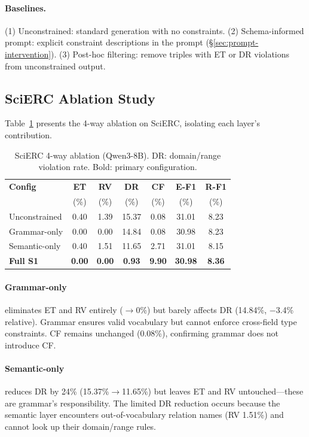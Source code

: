 \documentclass[11pt,a4paper]{article}
\begin{document}
\paragraph{Baselines.} (1) Unconstrained: standard generation with no constraints. (2) Schema-informed prompt: explicit constraint descriptions in the prompt (\S\ref{sec:prompt-intervention}). (3) Post-hoc filtering: remove triples with ET or DR violations from unconstrained output.

\subsection{SciERC Ablation Study}
\label{sec:scierc-ablation}

Table~\ref{tab:scierc-ablation} presents the 4-way ablation on SciERC, isolating each layer's contribution.

\begin{table}[t]
\centering
\small
\caption{SciERC 4-way ablation (Qwen3-8B). DR: domain/range violation rate. Bold: primary configuration.}
\label{tab:scierc-ablation}
\begin{tabular}{lcccccc}
\toprule
\textbf{Config} & \textbf{ET} & \textbf{RV} & \textbf{DR} & \textbf{CF} & \textbf{E-F1} & \textbf{R-F1} \\
 & (\%) & (\%) & (\%) & (\%) & (\%) & (\%) \\
\midrule
Unconstrained & 0.40 & 1.39 & 15.37 & 0.08 & 31.01 & 8.23 \\
Grammar-only & 0.00 & 0.00 & 14.84 & 0.08 & 30.98 & 8.23 \\
Semantic-only & 0.40 & 1.51 & 11.65 & 2.71 & 31.01 & 8.15 \\
\textbf{Full S1} & \textbf{0.00} & \textbf{0.00} & \textbf{0.93} & \textbf{9.90} & \textbf{30.98} & \textbf{8.36} \\
\bottomrule
\end{tabular}
\end{table}

\paragraph{Grammar-only} eliminates ET and RV entirely ($\to$0\%) but barely affects DR (14.84\%, $-$3.4\% relative). Grammar ensures valid vocabulary but cannot enforce cross-field type constraints. CF remains unchanged (0.08\%), confirming grammar does not introduce CF.

\paragraph{Semantic-only} reduces DR by 24\% (15.37\%$\to$11.65\%) but leaves ET and RV untouched---these are grammar's responsibility. The limited DR reduction occurs because the semantic layer encounters out-of-vocabulary relation names (RV 1.51\%) and cannot look up their domain/range rules.
\end{document}
